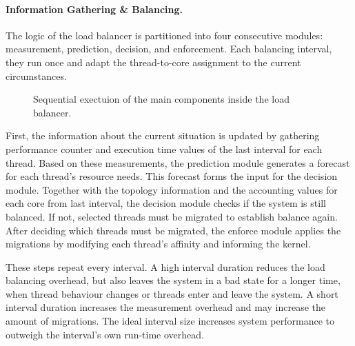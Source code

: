 \paragraph{Information Gathering \& Balancing.}
The logic of the load balancer is partitioned into four consecutive modules:
measurement, prediction, decision, and enforcement.
Each balancing interval, they run once and adapt the thread-to-core
assignment to the current circumstances.

\begin{figure}[h]
  \setcapindent*{1em}
  \begin{captionbeside}{Sequential exectuion of the main components inside the load
  balancer.}
  
  \end{captionbeside}
  \label{arch:fig:intervalcycle}
\end{figure}

First, the information about the current situation is updated by gathering
performance counter and execution time values of the last interval for each
thread.
Based on these measurements, the prediction module generates a forecast for
each thread's resource needs.
This forecast forms the input for the decision module.
Together with the topology information and the accounting values for each core
from last interval, the decision module checks if the system is still balanced.
If not, selected threads must be migrated to establish balance again.
After deciding which threads must be migrated, the enforce module applies the
migrations by modifying each thread's affinity and informing the kernel.

These steps repeat every interval. A high interval duration reduces the
load balancing overhead, but also leaves the system in a bad state for a longer
time, when thread behaviour changes or threads enter and leave the system.
A short interval duration increases the measurement overhead and may increase
the amount of migrations.
The ideal interval size increases system performance to outweigh the interval's
own run-time overhead.
\\

